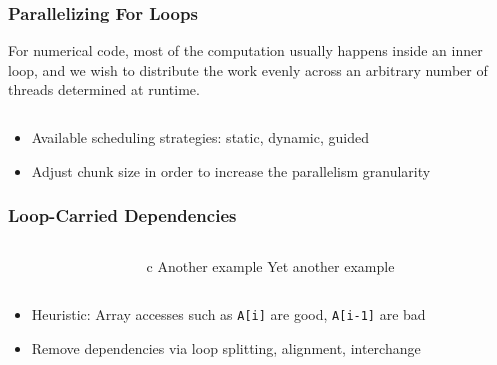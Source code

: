 \documentclass[handout]{beamer}
\begin{document}
\begin{frame}[fragile]
  \frametitle{Parallelizing For Loops}
  For numerical code, most of the computation usually happens inside an inner loop, and we wish to distribute the work evenly across an arbitrary number of threads determined at runtime.
  \begin{columns}[t]%
    \begin{column}{0.65\textwidth}
    \end{column}
    \pause
    \begin{column}{0.4\textwidth}
    \end{column}
  \end{columns}
  \pause
  \begin{itemize}
  \item Available scheduling strategies: static, dynamic, guided
  \item Adjust chunk size in order to increase the parallelism granularity
  \end{itemize}
\end{frame}



\begin{frame}[fragile]
  \frametitle{Loop-Carried Dependencies}
  \begin{columns}[t]%
    \begin{column}{0.65\textwidth}
    \end{column}
    \pause
    \begin{column}{0.4\textwidth}
      \begin{ccode}[]
        {c}
        Another example
        Yet another example

      \end{ccode}
    \end{column}
  \end{columns}
  \pause
  \begin{itemize}
  \item Heuristic: Array accesses such as \texttt{A[i]} are good, \texttt{A[i-1]} are bad
  \item Remove dependencies via loop splitting, alignment, interchange
  \end{itemize}
\end{frame}
\end{document}
